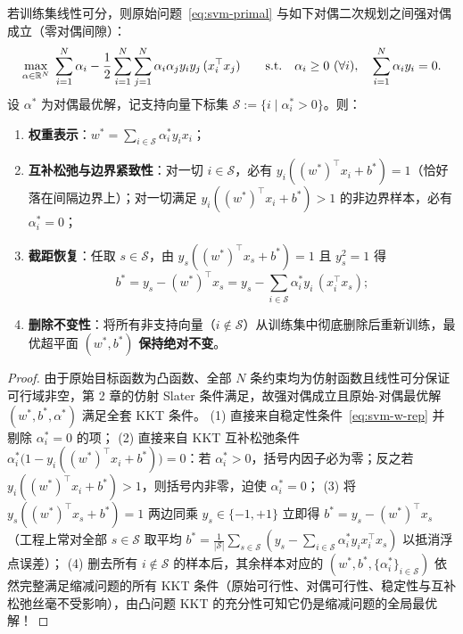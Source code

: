 \begin{thmBox}
\begin{theorem}\label{thm:svm-dual}
若训练集线性可分，则原始问题~\eqref{eq:svm-primal} 与如下对偶二次规划之间强对偶成立（零对偶间隙）：
\begin{equation}\label{eq:svm-dual}
  \max_{\alpha \in \mathbb{R}^N}\; \sum_{i=1}^{N} \alpha_i - \frac{1}{2}\sum_{i=1}^{N}\sum_{j=1}^{N} \alpha_i \alpha_j y_i y_j\, (x_i^\top x_j)
  \qquad \text{s.t.}\quad \alpha_i \ge 0\ (\forall i),\quad \sum_{i=1}^{N} \alpha_i y_i = 0.
\end{equation}
设 $\alpha^*$ 为对偶最优解，记支持向量下标集 $\mathcal{S} := \{i \mid \alpha_i^* > 0\}$。则：
\begin{enumerate}
  \item \textbf{权重表示}：$w^* = \sum_{i \in \mathcal{S}} \alpha_i^* y_i x_i$；
  \item \textbf{互补松弛与边界紧致性}：对一切 $i \in \mathcal{S}$，必有 $y_i((w^*)^\top x_i + b^*) = 1$（恰好落在间隔边界上）；对一切满足 $y_i((w^*)^\top x_i + b^*) > 1$ 的非边界样本，必有 $\alpha_i^* = 0$；
  \item \textbf{截距恢复}：任取 $s \in \mathcal{S}$，由 $y_s((w^*)^\top x_s + b^*) = 1$ 且 $y_s^2 = 1$ 得
  \[
    b^* = y_s - (w^*)^\top x_s = y_s - \sum_{i \in \mathcal{S}} \alpha_i^* y_i\, (x_i^\top x_s);
  \]
  \item \textbf{删除不变性}：将所有非支持向量（$i \notin \mathcal{S}$）从训练集中彻底删除后重新训练，最优超平面 $(w^*, b^*)$ \textbf{保持绝对不变}。
\end{enumerate}
\end{theorem}
\end{thmBox}

\begin{proof}
由于原始目标函数为凸函数、全部 $N$ 条约束均为仿射函数且线性可分保证可行域非空，第 2 章的仿射 Slater 条件满足，故强对偶成立且原始-对偶最优解 $(w^*, b^*, \alpha^*)$ 满足全套 KKT 条件。
(1) 直接来自稳定性条件~\eqref{eq:svm-w-rep} 并剔除 $\alpha_i^* = 0$ 的项；
(2) 直接来自 KKT 互补松弛条件 $\alpha_i^* \big(1 - y_i((w^*)^\top x_i + b^*)\big) = 0$：若 $\alpha_i^* > 0$，括号内因子必为零；反之若 $y_i((w^*)^\top x_i + b^*) > 1$，则括号内非零，迫使 $\alpha_i^* = 0$；
(3) 将 $y_s((w^*)^\top x_s + b^*) = 1$ 两边同乘 $y_s \in \{-1, +1\}$ 立即得 $b^* = y_s - (w^*)^\top x_s$（工程上常对全部 $s \in \mathcal{S}$ 取平均 $b^* = \frac{1}{|\mathcal{S}|}\sum_{s \in \mathcal{S}}(y_s - \sum_{i\in\mathcal{S}}\alpha_i^* y_i x_i^\top x_s)$ 以抵消浮点误差）；
(4) 删去所有 $i \notin \mathcal{S}$ 的样本后，其余样本对应的 $(w^*, b^*, \{\alpha_i^*\}_{i\in\mathcal{S}})$ 依然完整满足缩减问题的所有 KKT 条件（原始可行性、对偶可行性、稳定性与互补松弛丝毫不受影响），由凸问题 KKT 的充分性可知它仍是缩减问题的全局最优解！
\end{proof}

